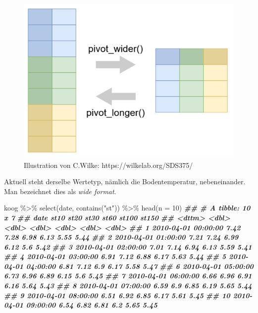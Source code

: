 \documentclass[
]{article}
\newenvironment{Shaded}{\begin{snugshade}}{\end{snugshade}}
\newcommand{\AttributeTok}[1]{\textcolor[rgb]{0.77,0.63,0.00}{#1}}
\newcommand{\DecValTok}[1]{\textcolor[rgb]{0.00,0.00,0.81}{#1}}
\newcommand{\DocumentationTok}[1]{\textcolor[rgb]{0.56,0.35,0.01}{\textbf{\textit{#1}}}}
\newcommand{\FunctionTok}[1]{\textcolor[rgb]{0.00,0.00,0.00}{#1}}
\newcommand{\NormalTok}[1]{#1}
\newcommand{\SpecialCharTok}[1]{\textcolor[rgb]{0.00,0.00,0.00}{#1}}
\newcommand{\StringTok}[1]{\textcolor[rgb]{0.31,0.60,0.02}{#1}}
\begin{document}
\begin{figure}

{\centering \includegraphics[width=1\linewidth]{images/042} 

}

\caption{Illustration von C.Wilke: https://wilkelab.org/SDS375/}\label{fig:unnamed-chunk-154}
\end{figure}

Aktuell steht derselbe Wertetyp, nämlich die Bodentemperatur, nebeneinander. Man bezeichnet dies als \emph{wide format}.

\begin{Shaded}
\begin{Highlighting}[]
\NormalTok{koog }\SpecialCharTok{\%\textgreater{}\%}
  \FunctionTok{select}\NormalTok{(date, }\FunctionTok{contains}\NormalTok{(}\StringTok{"st"}\NormalTok{)) }\SpecialCharTok{\%\textgreater{}\%}
  \FunctionTok{head}\NormalTok{(}\AttributeTok{n =} \DecValTok{10}\NormalTok{)}
\DocumentationTok{\#\# \# A tibble: 10 x 7}
\DocumentationTok{\#\#    date                 st10  st20  st30  st60 st100 st150}
\DocumentationTok{\#\#    \textless{}dttm\textgreater{}              \textless{}dbl\textgreater{} \textless{}dbl\textgreater{} \textless{}dbl\textgreater{} \textless{}dbl\textgreater{} \textless{}dbl\textgreater{} \textless{}dbl\textgreater{}}
\DocumentationTok{\#\#  1 2010{-}04{-}01 00:00:00  7.42  7.28  6.98  6.13  5.55  5.44}
\DocumentationTok{\#\#  2 2010{-}04{-}01 01:00:00  7.21  7.24  6.99  6.12  5.6   5.42}
\DocumentationTok{\#\#  3 2010{-}04{-}01 02:00:00  7.01  7.14  6.94  6.13  5.59  5.41}
\DocumentationTok{\#\#  4 2010{-}04{-}01 03:00:00  6.91  7.12  6.88  6.17  5.63  5.44}
\DocumentationTok{\#\#  5 2010{-}04{-}01 04:00:00  6.81  7.12  6.9   6.17  5.58  5.47}
\DocumentationTok{\#\#  6 2010{-}04{-}01 05:00:00  6.73  6.96  6.89  6.15  5.6   5.45}
\DocumentationTok{\#\#  7 2010{-}04{-}01 06:00:00  6.66  6.96  6.91  6.16  5.64  5.43}
\DocumentationTok{\#\#  8 2010{-}04{-}01 07:00:00  6.59  6.9   6.85  6.19  5.65  5.44}
\DocumentationTok{\#\#  9 2010{-}04{-}01 08:00:00  6.51  6.92  6.85  6.17  5.61  5.45}
\DocumentationTok{\#\# 10 2010{-}04{-}01 09:00:00  6.54  6.82  6.81  6.2   5.65  5.45}
\end{Highlighting}
\end{Shaded}
\end{document}

